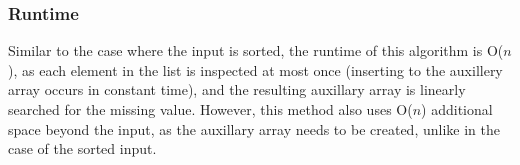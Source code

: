 \documentclass[titlepage]{article}
\numberwithin{equation}{subsection}
\begin{document}
\subsubsection{Runtime}
Similar to the case where the input is sorted, the runtime
of this algorithm is O($n$), as each element in the list is
inspected at most once (inserting to the auxillery array occurs 
in constant time), and the resulting auxillary array is
linearly searched for the missing value. However, this method
also uses O($n$) additional space beyond the input, as the
auxillary array needs to be created, unlike in the case of
the sorted input.
\end{document}
